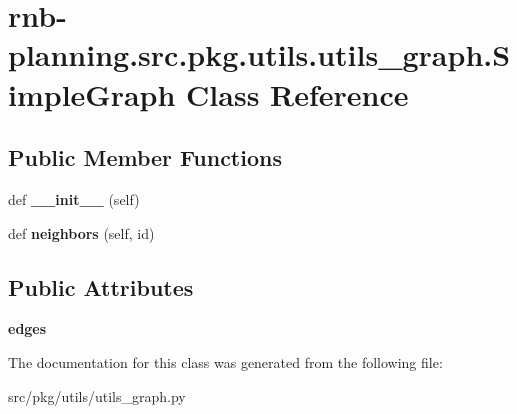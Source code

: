 \hypertarget{classrnb-planning_1_1src_1_1pkg_1_1utils_1_1utils__graph_1_1_simple_graph}{}\section{rnb-\/planning.src.\+pkg.\+utils.\+utils\+\_\+graph.\+Simple\+Graph Class Reference}
\label{classrnb-planning_1_1src_1_1pkg_1_1utils_1_1utils__graph_1_1_simple_graph}
\subsection*{Public Member Functions}
\begin{DoxyCompactItemize}
\item 
\mbox{\label{classrnb-planning_1_1src_1_1pkg_1_1utils_1_1utils__graph_1_1_simple_graph_a9f0e10e7c903e3d32b3d81d2ca4d0397}} 
def {\bfseries \+\_\+\+\_\+init\+\_\+\+\_\+} (self)
\item 
\mbox{\label{classrnb-planning_1_1src_1_1pkg_1_1utils_1_1utils__graph_1_1_simple_graph_ac34e7781a59694a4067d0e2d413dced2}} 
def {\bfseries neighbors} (self, id)
\end{DoxyCompactItemize}
\subsection*{Public Attributes}
\begin{DoxyCompactItemize}
\item 
\mbox{\label{classrnb-planning_1_1src_1_1pkg_1_1utils_1_1utils__graph_1_1_simple_graph_ad966862a1a518542eb37712559961899}} 
{\bfseries edges}
\end{DoxyCompactItemize}


The documentation for this class was generated from the following file\+:\begin{DoxyCompactItemize}
\item 
src/pkg/utils/utils\+\_\+graph.\+py\end{DoxyCompactItemize}
